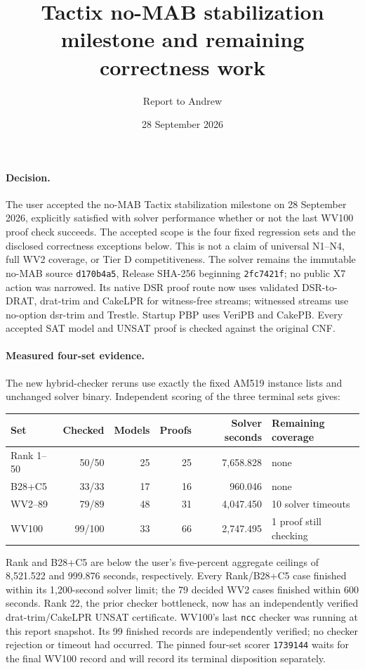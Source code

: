 \documentclass[11pt]{article}
\title{Tactix no-MAB stabilization milestone and remaining correctness work}
\author{Report to Andrew}
\date{28 September 2026}
\begin{document}
\maketitle

\paragraph{Decision.}
The user accepted the no-MAB Tactix stabilization milestone on 28 September 2026, explicitly satisfied with solver performance whether or not the last WV100 proof check succeeds. The accepted scope is the four fixed regression sets and the disclosed correctness exceptions below. This is not a claim of universal N1--N4, full WV2 coverage, or Tier D competitiveness. The solver remains the immutable no-MAB source \texttt{d170b4a5}, Release SHA-256 beginning \texttt{2fc7421f}; no public X7 action was narrowed. Its native DSR proof route now uses validated DSR-to-DRAT, drat-trim and CakeLPR for witness-free streams; witnessed streams use no-option dsr-trim and Trestle. Startup PBP uses VeriPB and CakePB. Every accepted SAT model and UNSAT proof is checked against the original CNF.

\paragraph{Measured four-set evidence.}
The new hybrid-checker reruns use exactly the fixed AM519 instance lists and unchanged solver binary. Independent scoring of the three terminal sets gives:
\begin{center}
\begin{tabular}{@{}lrrrrl@{}}
\toprule
Set & Checked & Models & Proofs & Solver seconds & Remaining coverage \\
\midrule
Rank 1--50 & 50/50 & 25 & 25 & 7,658.828 & none \\
B28+C5 & 33/33 & 17 & 16 & 960.046 & none \\
WV2--89 & 79/89 & 48 & 31 & 4,047.450 & 10 solver timeouts \\
WV100 & 99/100 & 33 & 66 & 2,747.495 & 1 proof still checking \\
\bottomrule
\end{tabular}
\end{center}
Rank and B28+C5 are below the user's five-percent aggregate ceilings of 8,521.522 and 999.876 seconds, respectively. Every Rank/B28+C5 case finished within its 1,200-second solver limit; the 79 decided WV2 cases finished within 600 seconds. Rank 22, the prior checker bottleneck, now has an independently verified drat-trim/CakeLPR UNSAT certificate. WV100's last \texttt{ncc} checker was running at this report snapshot. Its 99 finished records are independently verified; no checker rejection or timeout had occurred. The pinned four-set scorer \texttt{1739144} waits for the final WV100 record and will record its terminal disposition separately.
\end{document}
